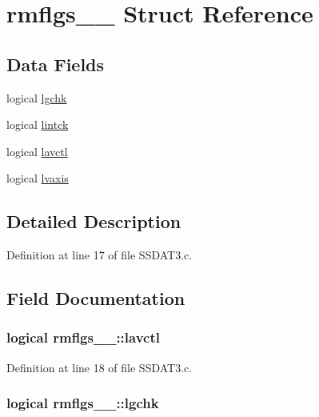 \hypertarget{structrmflgs__1__}{}\section{rmflgs\+\_\+\_\+ Struct Reference}
\label{structrmflgs__1__}
\subsection*{Data Fields}
\begin{DoxyCompactItemize}
\item 
logical \hyperlink{structrmflgs__1___adf3db8c63cb2f64fb2fca2d824c3d118}{lgchk}
\item 
logical \hyperlink{structrmflgs__1___a174bc032f247872151ec05bc3e5f1cb3}{lintck}
\item 
logical \hyperlink{structrmflgs__1___a239e9f6e2e4f4b24cc28743e61553133}{lavctl}
\item 
logical \hyperlink{structrmflgs__1___ada293317df93347fa629e11366dfa21d}{lvaxis}
\end{DoxyCompactItemize}


\subsection{Detailed Description}


Definition at line 17 of file S\+S\+D\+A\+T3.\+c.



\subsection{Field Documentation}
\subsubsection[{\texorpdfstring{lavctl}{lavctl}}]{\setlength{\rightskip}{0pt plus 5cm}logical rmflgs\+\_\+\_\+\+::lavctl}\hypertarget{structrmflgs__1___a239e9f6e2e4f4b24cc28743e61553133}{}\label{structrmflgs__1___a239e9f6e2e4f4b24cc28743e61553133}


Definition at line 18 of file S\+S\+D\+A\+T3.\+c.

\subsubsection[{\texorpdfstring{lgchk}{lgchk}}]{\setlength{\rightskip}{0pt plus 5cm}logical rmflgs\+\_\+\_\+\+::lgchk}\hypertarget{structrmflgs__1___adf3db8c63cb2f64fb2fca2d824c3d118}{}\label{structrmflgs__1___adf3db8c63cb2f64fb2fca2d824c3d118}


